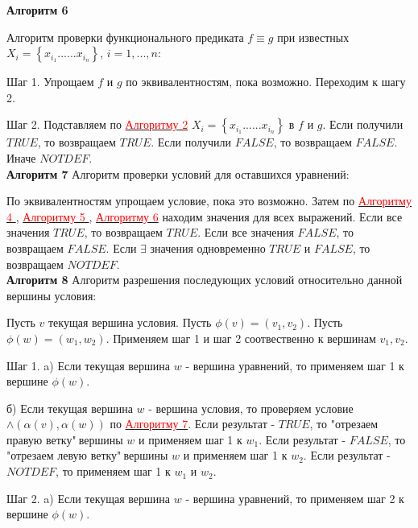 \documentclass[12pt]{article}
\begin{document}
      \hypertarget{a6}{{\bf Алгоритм 6}} Алгоритм проверки функционального предиката $f \equiv g $ при известных $ X_{i} = \left\lbrace x_{i_{1}} ......x_{i_{n}}\right\rbrace $, $i = 1,...,n$:
      
      Шаг 1. Упрощаем $f$ и $g$ по эквивалентностям, пока возможно. Переходим к шагу 2.
      
      Шаг 2. Подставляем по \hyperlink{a2}{ \textcolor{red}{Алгоритму 2}} $ X_{i} = \left\lbrace x_{i_{1}} ......x_{i_{n}}\right\rbrace $ в $f$ и $g$. Если получили $TRUE$, то возвращаем  $TRUE$.  Если получили $FALSE$, то возвращаем  $FALSE$. Иначе $NOTDEF$.
     \\
     
    
      
      \hypertarget{a7}{{\bf Алгоритм 7}} Алгоритм проверки условий для оставшихся уравнений:
     
       
       По эквивалентностям упрощаем условие, пока это возможно. Затем по   \hyperlink{a4}{ \textcolor{red}{Алгоритму 4 }},  \hyperlink{a5}{ \textcolor{red}{Алгоритму 5 }},  \hyperlink{a6}{ \textcolor{red}{Алгоритму 6}} находим значения для всех выражений. Если все значения $TRUE$, то возвращаем $TRUE$. Если все значения $FALSE$, то возвращаем $FALSE$. Если $\exists$ значения одновременно $TRUE$ и $FALSE$, то возвращаем $NOTDEF$.
      \\
      
      \hypertarget{a8}{{\bf Алгоритм 8}} Алгоритм разрешения последующих условий относительно данной вершины условия:
      
       Пусть $v$ текущая вершина условия. Пусть $\phi(v)=(v_{1},v_{2})$. Пусть $\phi(w)=(w_{1},w_{2})$. Применяем шаг 1 и шаг 2 соотвественно к вершинам $v_{1},v_{2}$.
       
       Шаг 1. a) Если текущая вершина $w$ - вершина уравнений, то применяем шаг 1 к вершине $\phi(w)$. 
       
       б) Если текущая вершина $w$ - вершина условия, то проверяем условие $\wedge(\alpha(v),\alpha(w))$ по  \hyperlink{a7}{ \textcolor{red}{Алгоритму 7}}. Если результат - $TRUE$, то "отрезаем правую ветку"$\:$вершины $w$ и применяем шаг 1 к $w_{1}$. Если результат - $FALSE$, то "отрезаем левую ветку"$\:$вершины $w$ и применяем шаг 1 к $w_{2}$. Если результат - $NOTDEF$, то применяем шаг 1 к $w_{1}$ и $w_{2}$. 
       
       Шаг 2. a) Если текущая вершина $w$ - вершина уравнений, то применяем шаг 2 к вершине $\phi(w)$.
       
\end{document}
